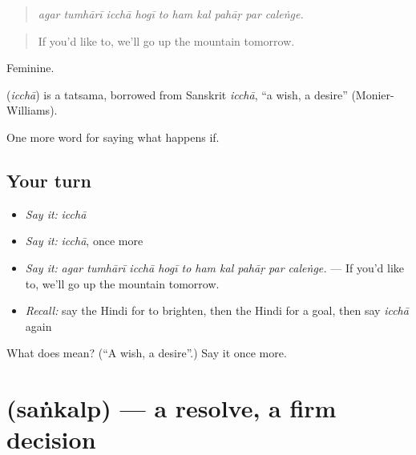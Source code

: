 \begin{quote}
         
\end{quote}

\begin{quote}
\emph{agar tumhārī icchā hogī to ham kal pahāṛ par caleṅge.}
\end{quote}

\begin{quote}
If you'd like to, we'll go up the mountain tomorrow.
\end{quote}

Feminine.

\begin{cousinweb}
\textbf{} (\emph{icchā}) is a tatsama, borrowed from Sanskrit \emph{icchā}, \textquotedblleft{}a wish, a desire\textquotedblright{} (Monier-Williams).
\end{cousinweb}

\begin{grammarlens}[title={What you've built}]
One more word for saying what happens if.
\end{grammarlens}

\subsection*{Your turn}
\begin{itemize}
\raggedright
  \item \emph{Say it:} \emph{icchā}
  \item \emph{Say it:} \emph{icchā}, once more
  \item \emph{Say it:} \emph{agar tumhārī icchā hogī to ham kal pahāṛ par caleṅge.} — If you'd like to, we'll go up the mountain tomorrow.
  \item \emph{Recall:} say the Hindi for to brighten, then the Hindi for a goal, then say \emph{icchā} again
\end{itemize}

\begin{tcolorbox}[breakable,colback=teal!4,colframe=teal!35!black,title={Before you move on}]
What does  mean? (\textquotedblleft{}A wish, a desire\textquotedblright{}.) Say it once more.
\end{tcolorbox}
\section[\texorpdfstring{\hi{संकल्प} (saṅkalp)}{संकल्प (saṅkalp)}]{ (saṅkalp) — a resolve, a firm decision}


